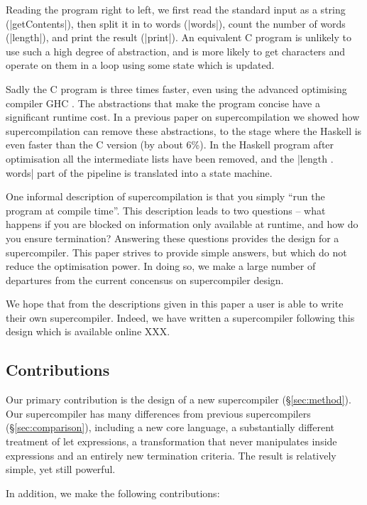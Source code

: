 \documentclass{sigplanconf}
\newcommand{\unknown}{XXX}
\begin{document}
Reading the program right to left, we first read the standard input as a string (|getContents|), then split it in to words (|words|), count the number of words (|length|), and print the result (|print|). An equivalent C program is unlikely to use such a high degree of abstraction, and is more likely to get characters and operate on them in a loop using some state which is updated.

Sadly the C program is three times faster, even using the advanced optimising compiler GHC \cite{GHC}. The abstractions that make the program concise have a significant runtime cost. In a previous paper on supercompilation \cite{me:supero} we showed how supercompilation can remove these abstractions, to the stage where the Haskell is even faster than the C version (by about 6\%). In the Haskell program after optimisation all the intermediate lists have been removed, and the |length . words| part of the pipeline is translated into a state machine.

One informal description of supercompilation is that you simply ``run the program at compile time''. This description leads to two questions -- what happens if you are blocked on information only available at runtime, and how do you ensure termination? Answering these questions provides the design for a supercompiler. This paper strives to provide simple answers, but which do not reduce the optimisation power. In doing so, we make a large number of departures from the current concensus on supercompiler design.

We hope that from the descriptions given in this paper a user is able to write their own supercompiler. Indeed, we have written a supercompiler following this design which is available online \unknown{}.

\subsection{Contributions}

Our primary contribution is the design of a new supercompiler (\S\ref{sec:method}). Our supercompiler has many differences from previous supercompilers (\S\ref{sec:comparison}), including a new core language, a substantially different treatment of let expressions, a transformation that never manipulates inside expressions and an entirely new termination criteria. The result is relatively simple, yet still powerful.

In addition, we make the following contributions:
\end{document}
